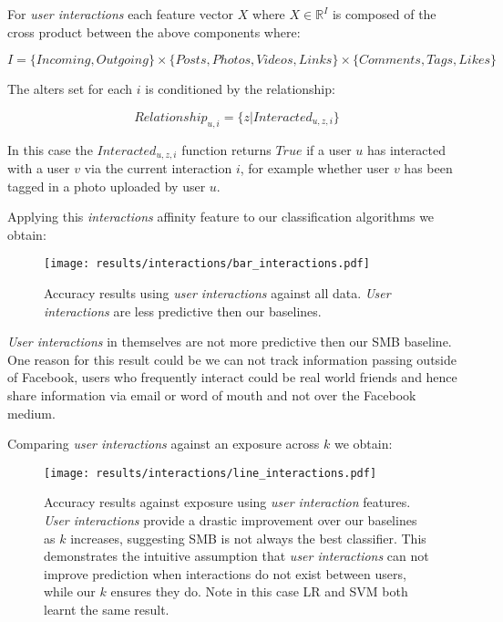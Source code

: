 For \emph{user interactions} each feature vector $X$ where $X \in \mathbb{R}^I$ is composed of the cross product between the above components where:

\[ I = \{Incoming, Outgoing\} \times \{Posts,Photos,Videos,Links\} \times \{Comments,Tags,Likes\} \]

The alters set for each $i$ is conditioned by the relationship:

\[ Relationship_{u,i} = \{z | Interacted_{u,z,i}\} \]

In this case the $Interacted_{u,z,i}$ function returns $True$ if a user $u$ has interacted with a user $v$ via the current interaction $i$, for 
example whether user $v$ has been tagged in a photo uploaded by user $u$.

Applying this \emph{interactions} affinity feature to our classification algorithms we obtain:

\begin{figure}[tbh!]
	\begin{center}
		\texttt{[image: results/interactions/bar\_interactions.pdf]}
		\caption{Accuracy results using \emph{user interactions} against all data. \emph{User interactions} are less predictive then our baselines.}
	\end{center}
\end{figure}

\emph{User interactions} in themselves are not more predictive then our SMB baseline. One reason for this result could be we can 
not track information passing outside of Facebook, users who frequently interact could be real world friends and hence share 
information via email or word of mouth and not over the Facebook medium.

\clearpage

Comparing \emph{user interactions} against an exposure across $k$ we obtain:

\begin{figure}[tbh!]
	\begin{center}
		\texttt{[image: results/interactions/line\_interactions.pdf]}
		\caption{Accuracy results against exposure using \emph{user interaction} features. \emph{User interactions} provide a drastic improvement 
		over our baselines as $k$ increases, suggesting SMB is not always the best classifier. 
		This demonstrates the intuitive assumption that \emph{user interactions} can not improve prediction when interactions do not exist between users, while our $k$ ensures they do.
		Note in this case LR and SVM both learnt the same result.}
	\end{center}
\end{figure}

